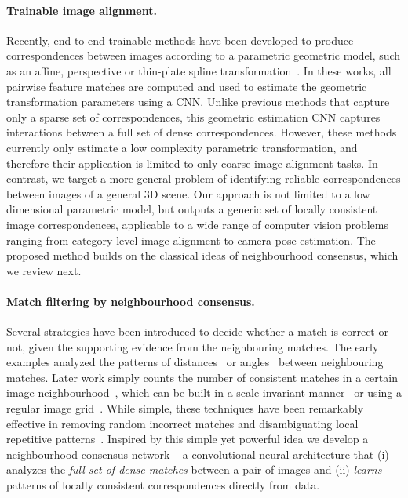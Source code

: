 \documentclass{article}
\begin{document}
\paragraph{Trainable image alignment.}
Recently, end-to-end trainable methods have been developed to produce correspondences between images according to a parametric geometric model, such as an affine, perspective or thin-plate spline transformation~\cite{Rocco17,Rocco18}. In these works, all pairwise feature matches are computed and used to estimate the geometric transformation parameters using a CNN. Unlike previous methods that capture only a sparse set of correspondences, this geometric estimation CNN captures interactions between a full set of dense correspondences.
However, these methods currently only estimate a low complexity parametric transformation, and therefore their application is limited to only coarse image alignment tasks.
In contrast, we target a more general problem of identifying reliable correspondences between images of a general 3D scene. Our approach is not limited to a low dimensional parametric model, but outputs a generic set of locally consistent image correspondences, applicable to a wide range of computer vision problems ranging from category-level image alignment to camera pose estimation. The proposed method builds on the classical ideas of neighbourhood consensus, which we review next.

\paragraph{Match filtering by neighbourhood consensus.}
Several strategies have been introduced to decide whether a match is correct or not, given the supporting evidence from the neighbouring matches.  The early examples analyzed the patterns of distances~\cite{zhang1995robust} or angles~\cite{schmid1997local} between neighbouring matches. Later work simply counts the number of consistent matches in a certain image neighbourhood~\cite{Schaffalitzky02a,Sivic03}, which can be built in a scale invariant manner~\cite{Sattler09} or using a regular image grid~\cite{bian2017gms}. While simple, these techniques have been remarkably effective in removing random incorrect matches and disambiguating local repetitive patterns~\cite{Sattler09}. Inspired by this simple yet powerful idea we develop a neighbourhood consensus network -- a convolutional neural architecture that (i) analyzes the {\em full set of dense matches} between a pair of images and (ii) {\em learns} patterns of locally consistent correspondences directly from data.
\end{document}
